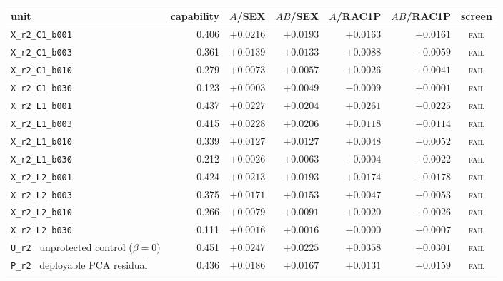 \begin{tabular}{@{}l r r r r r c@{}}
\toprule
unit & capability & $A$/SEX & $AB$/SEX & $A$/RAC1P & $AB$/RAC1P & screen \\
\midrule
\texttt{X\_r2\_C1\_b001} & 0.406 & $+0.0216$ & $+0.0193$ & $+0.0163$ & $+0.0161$ & \textsc{fail} \\
\texttt{X\_r2\_C1\_b003} & 0.361 & $+0.0139$ & $+0.0133$ & $+0.0088$ & $+0.0059$ & \textsc{fail} \\
\texttt{X\_r2\_C1\_b010} & 0.279 & $+0.0073$ & $+0.0057$ & $+0.0026$ & $+0.0041$ & \textsc{fail} \\
\texttt{X\_r2\_C1\_b030} & 0.123 & $+0.0003$ & $+0.0049$ & $-0.0009$ & $+0.0001$ & \textsc{fail} \\
\addlinespace[2pt]
\texttt{X\_r2\_L1\_b001} & 0.437 & $+0.0227$ & $+0.0204$ & $+0.0261$ & $+0.0225$ & \textsc{fail} \\
\texttt{X\_r2\_L1\_b003} & 0.415 & $+0.0228$ & $+0.0206$ & $+0.0118$ & $+0.0114$ & \textsc{fail} \\
\texttt{X\_r2\_L1\_b010} & 0.339 & $+0.0127$ & $+0.0127$ & $+0.0048$ & $+0.0052$ & \textsc{fail} \\
\texttt{X\_r2\_L1\_b030} & 0.212 & $+0.0026$ & $+0.0063$ & $-0.0004$ & $+0.0022$ & \textsc{fail} \\
\addlinespace[2pt]
\texttt{X\_r2\_L2\_b001} & 0.424 & $+0.0213$ & $+0.0193$ & $+0.0174$ & $+0.0178$ & \textsc{fail} \\
\texttt{X\_r2\_L2\_b003} & 0.375 & $+0.0171$ & $+0.0153$ & $+0.0047$ & $+0.0053$ & \textsc{fail} \\
\texttt{X\_r2\_L2\_b010} & 0.266 & $+0.0079$ & $+0.0091$ & $+0.0020$ & $+0.0026$ & \textsc{fail} \\
\texttt{X\_r2\_L2\_b030} & 0.111 & $+0.0016$ & $+0.0016$ & $-0.0000$ & $+0.0007$ & \textsc{fail} \\
\addlinespace[2pt]
\texttt{U\_r2} \ unprotected control ($\beta=0$) & 0.451 & $+0.0247$ & $+0.0225$ & $+0.0358$ & $+0.0301$ & \textsc{fail} \\
\texttt{P\_r2} \ deployable PCA residual & 0.436 & $+0.0186$ & $+0.0167$ & $+0.0131$ & $+0.0159$ & \textsc{fail} \\
\bottomrule
\end{tabular}
